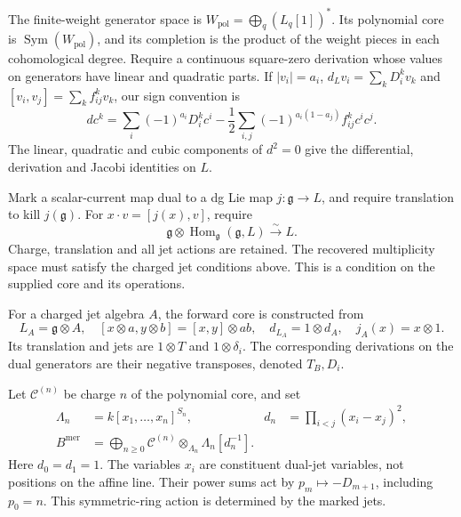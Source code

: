 The finite-weight generator space is
$W_{\mathrm{pol}}=\bigoplus_q(L_q[1])^*$.
Its polynomial core is $\operatorname{Sym}(W_{\mathrm{pol}})$,
and its completion is the product of the weight pieces
in each cohomological degree. Require a continuous
square-zero derivation whose values on generators have
linear and quadratic parts. If $|v_i|=a_i$,
$d_Lv_i=\sum_kD_i^kv_k$ and $[v_i,v_j]=\sum_kf_{ij}^kv_k$,
our sign convention is
\begin{equation}\label{v4-arith:md:eq:current-differential}
 dc^k=\sum_i(-1)^{a_i}D_i^kc^i
 -\frac12\sum_{i,j}(-1)^{a_i(1-a_j)}f_{ij}^kc^ic^j.
\end{equation}
The linear, quadratic and cubic components of $d^2=0$
give the differential, derivation and Jacobi identities
on $L$.

Mark a scalar-current map dual to a dg Lie map
$j:\mathfrak g\to L$, and require translation to kill
$j(\mathfrak g)$. For $x\cdot v=[j(x),v]$, require
\begin{equation}\label{v4-arith:md:eq:isotypic}
 \mathfrak g\otimes
 \operatorname{Hom}_{\mathfrak g}(\mathfrak g,L)
 \xrightarrow{\sim}L.
\end{equation}
Charge, translation and all jet actions are retained.
The recovered multiplicity space must satisfy the
charged jet conditions above. This is a condition on
the supplied core and its operations.

For a charged jet algebra $A$, the forward core is
constructed from
\[
 L_A=\mathfrak g\otimes A,
 \quad[x\otimes a,y\otimes b]=[x,y]\otimes ab,
 \quad d_{L_A}=1\otimes d_A,
 \quad j_A(x)=x\otimes1.
\]
Its translation and jets are $1\otimes T$ and
$1\otimes\delta_i$. The corresponding derivations on
the dual generators are their negative transposes,
denoted $T_B,D_i$.

Let $\mathcal C^{(n)}$ be charge $n$ of the polynomial
core, and set
\begin{equation}\label{v4-arith:md:eq:current-localization}
 \begin{aligned}
 \Lambda_n&=k[x_1,\ldots,x_n]^{S_n},
 &d_n&=\prod_{i<j}(x_i-x_j)^2,\\
 B^{\mathrm{mer}}&=\bigoplus_{n\geq0}
 \mathcal C^{(n)}\otimes_{\Lambda_n}\Lambda_n[d_n^{-1}].
 \end{aligned}
\end{equation}
Here $d_0=d_1=1$. The variables $x_i$ are constituent
dual-jet variables, not positions on the affine line.
Their power sums act by $p_m\mapsto-D_{m+1}$, including
$p_0=n$. This symmetric-ring action is determined by
the marked jets.

